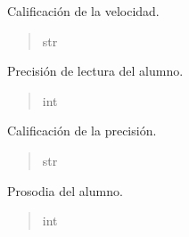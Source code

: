 \documentclass[letterpaper,10pt,spanish]{sphinxmanual}
\begin{document}
\begin{fulllineitems}
\begin{fulllineitems}
\pysigstartsignatures
{}
\pysigstopsignatures
\sphinxAtStartPar
Calificación de la velocidad.
\begin{quote}\begin{description}
\sphinxAtStartPar
str

\end{description}\end{quote}

\end{fulllineitems}



\begin{fulllineitems}

\pysigstartsignatures
{}
\pysigstopsignatures
\sphinxAtStartPar
Precisión de lectura del alumno.
\begin{quote}\begin{description}
\sphinxAtStartPar
int

\end{description}\end{quote}

\end{fulllineitems}



\begin{fulllineitems}

\pysigstartsignatures
{}
\pysigstopsignatures
\sphinxAtStartPar
Calificación de la precisión.
\begin{quote}\begin{description}
\sphinxAtStartPar
str

\end{description}\end{quote}

\end{fulllineitems}



\begin{fulllineitems}

\pysigstartsignatures
{}
\pysigstopsignatures
\sphinxAtStartPar
Prosodia del alumno.
\begin{quote}\begin{description}
\sphinxAtStartPar
int

\end{description}\end{quote}


\end{fulllineitems}
\end{fulllineitems}
\end{document}
